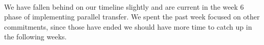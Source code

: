 \documentclass[11pt]{article}
\begin{document}
	~\\
	We have fallen behind on our timeline slightly and are current in the week 6 phase of implementing parallel transfer. We spent the past week focused on other commitments, since those have ended we should have more time to catch up in the following weeks.

	
			
	
\end{document}
